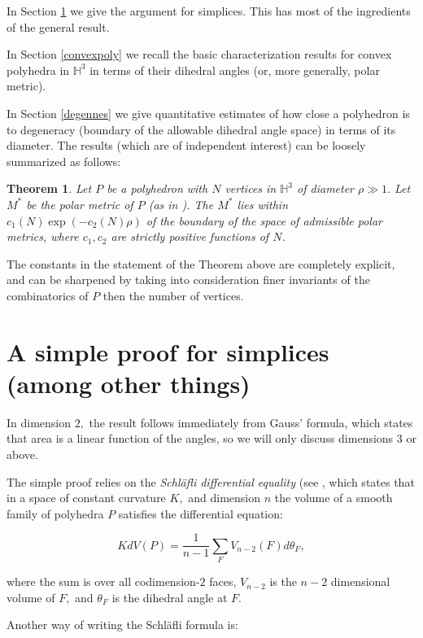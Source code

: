 \documentclass[12pt]{amsart}
\newtheorem{theorem}{Theorem}
\theoremstyle{remark}
\begin{document}
In Section \ref{simplices} we give the argument for simplices. This has most
of the ingredients of the general result. 

In Section \ref{convexpoly} we recall the basic characterization results for
convex polyhedra in $\mathbb{H}^3$ in terms of their dihedral angles (or, more
generally, polar metric). 

In Section \ref{degennes} we give quantitative estimates of how close a
polyhedron is to degeneracy (boundary of the allowable dihedral angle space)
in terms of its diameter. The results (which are of independent interest) can
be loosely summarized as follows: 

\begin{theorem}
Let $P$ be a polyhedron with $N$ vertices in $\mathbb{H}^3$ of diameter $\rho
\gg 1.$ Let $M^*$ be the polar metric of $P$ (as in \cite{thes,thes0}). The
$M^*$ lies within $c_1(N) \exp(-c_2(N) \rho)$ of the boundary of the space of
admissible polar metrics, where $c_1, c_2$ are strictly positive functions of
$N$. 
\end{theorem}
The constants in the statement of the Theorem above are completely explicit,
and can be sharpened by taking into consideration finer invariants of the
combinatorics of $P$ then the number of vertices. 


\section{A simple proof for simplices (among other things)}
\label{simplices}

In dimension $2,$ the result follows immediately from Gauss' formula, which
states that area is a linear function of the angles, so we will only discuss
dimensions $3$ or above. 

The simple proof relies on the \emph{Schl\"afli differential equality} (see 
\cite{milnorcol}, which states that in a space of constant curvature $K,$ and
dimension $n$ the volume of a smooth family of polyhedra $P$ satisfies the
differential equation: 

\begin{equation}
\label{schlafli1}
K d V(P) = \dfrac{1}{n-1} \sum_F V_{n-2}(F) d \theta_F,
\end{equation}

where the sum is over all codimension-$2$ faces, $V_{n-2}$ is the $n-2$ dimensional volume of $F,$ and $\theta_F$ is the dihedral angle at $F.$

Another way of writing the Schl\"afli formula is:
\end{document}
